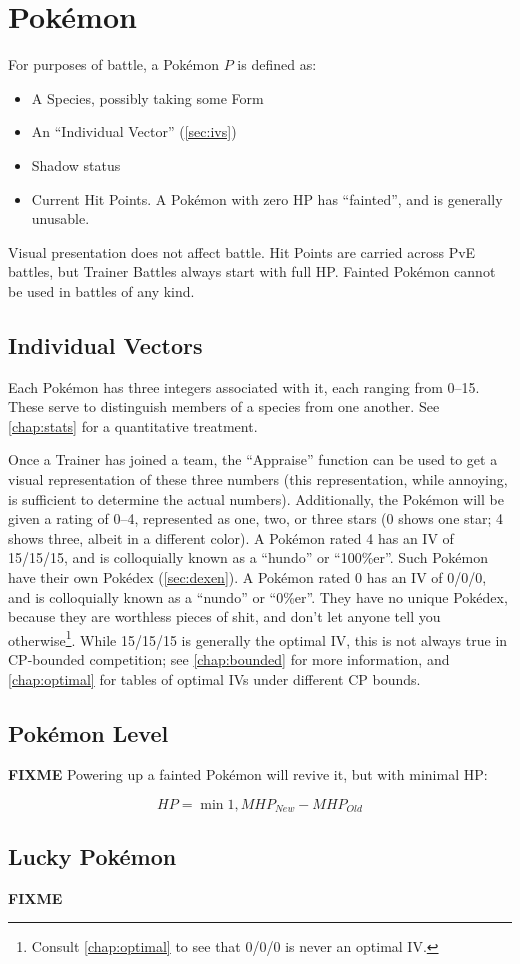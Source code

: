 \chapter{Pokémon}
\label{chap:pokemon}
For purposes of battle, a Pokémon $P$ is defined as:
\begin{itemize}
\item A Species, possibly taking some Form
\item An ``Individual Vector'' (\autoref{sec:ivs})
\item Shadow status
\item Current Hit Points. A Pokémon with zero HP has ``fainted'', and is generally unusable.
\end{itemize}
Visual presentation does not affect battle.
Hit Points are carried across PvE battles, but Trainer Battles always start
 with full HP\@.
Fainted Pokémon cannot be used in battles of any kind.

\section{Individual Vectors}
\label{sec:ivs}
Each Pokémon has three integers associated with it, each ranging from 0--15.
These serve to distinguish members of a species from one another.
See \autoref{chap:stats} for a quantitative treatment.

Once a Trainer has joined a team, the ``Appraise'' function can be used to
  get a visual representation of these three numbers (this representation,
  while annoying, is sufficient to determine the actual numbers).
Additionally, the Pokémon will be given a rating of 0--4, represented as
  one, two, or three stars (0 shows one star; 4 shows three, albeit in a different color).
A Pokémon rated 4 has an IV of 15/15/15, and is colloquially known as a ``hundo'' or ``100\%er''.
Such Pokémon have their own Pokédex (\autoref{sec:dexen}).
A Pokémon rated 0 has an IV of 0/0/0, and is colloquially known as a ``nundo'' or ``0\%er''.
They have no unique Pokédex, because they are worthless pieces of shit,
  and don't let anyone tell you otherwise\footnote{Consult \autoref{chap:optimal}
  to see that 0/0/0 is never an optimal IV.}.
While 15/15/15 is generally the optimal IV, this is not always true in CP-bounded
  competition; see \autoref{chap:bounded} for more information,
  and \autoref{chap:optimal} for tables of optimal IVs under different CP bounds.

\section{Pokémon Level}
\label{sec:plevel}
\textbf{FIXME}
Powering up a fainted Pokémon will revive it, but with minimal HP\@:

\[ HP = \min{1, MHP_{New} - MHP_{Old} } \]

\section{Lucky Pokémon}
\label{sec:lucky}
\textbf{FIXME}
